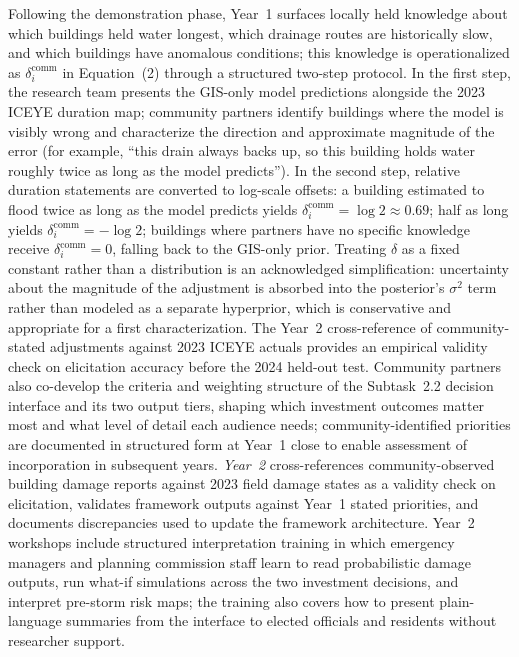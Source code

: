 \documentclass[11pt]{article}
\begin{document}
Following the demonstration phase, Year~1 surfaces locally held knowledge about which
buildings held water longest, which drainage routes are historically slow, and which
buildings have anomalous conditions; this knowledge is operationalized as
$\delta_i^{\mathrm{comm}}$ in Equation~(2) through a structured two-step protocol.
In the first step, the research team presents the GIS-only model predictions alongside
the 2023 ICEYE duration map; community partners identify buildings where the model is
visibly wrong and characterize the direction and approximate magnitude of the error
(for example, ``this drain always backs up, so this building holds water roughly twice
as long as the model predicts'').
In the second step, relative duration statements are converted to log-scale offsets:
a building estimated to flood twice as long as the model predicts yields
$\delta_i^{\mathrm{comm}} = \log 2 \approx 0.69$; half as long yields
$\delta_i^{\mathrm{comm}} = -\log 2$; buildings where partners have no specific
knowledge receive $\delta_i^{\mathrm{comm}} = 0$, falling back to the GIS-only prior.
Treating $\delta$ as a fixed constant rather than a distribution is an acknowledged
simplification: uncertainty about the magnitude of the adjustment is absorbed into
the posterior's $\sigma^2$ term rather than modeled as a separate hyperprior, which
is conservative and appropriate for a first characterization.
The Year~2 cross-reference of community-stated adjustments against 2023 ICEYE actuals
provides an empirical validity check on elicitation accuracy before the 2024 held-out
test.
Community partners also co-develop the criteria and weighting structure of the
Subtask~2.2 decision interface and its two output tiers, shaping which investment
outcomes matter most and what level of detail each audience needs; community-identified
priorities are documented in structured form at Year~1 close to enable assessment
of incorporation in subsequent years.
\textit{Year~2} cross-references community-observed building damage reports against
2023 field damage states as a validity check on elicitation, validates framework
outputs against Year~1 stated priorities, and documents discrepancies used to update
the framework architecture.
Year~2 workshops include structured interpretation training in which emergency
managers and planning commission staff learn to read probabilistic damage outputs,
run what-if simulations across the two investment decisions, and interpret pre-storm
risk maps; the training also covers how to present plain-language summaries from the
interface to elected officials and residents without researcher support.
\end{document}
